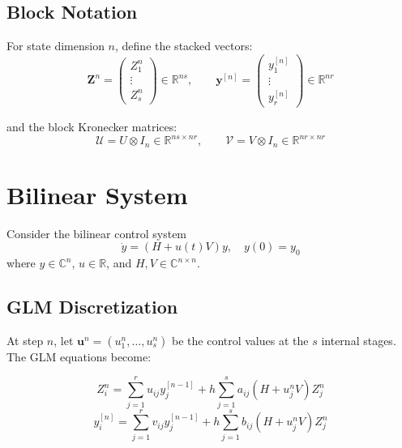 \documentclass[11pt]{article}
\newcommand{\RR}{\mathbb{R}}
\newcommand{\CC}{\mathbb{C}}
\newcommand{\Zv}{\mathbf{Z}}
\newcommand{\yv}{\mathbf{y}}
\newcommand{\uv}{\mathbf{u}}
\newcommand{\Uv}{\mathcal{U}}
\newcommand{\Vv}{\mathcal{V}}
\begin{document}
\subsection{Block Notation}

For state dimension $n$, define the stacked vectors:
\begin{equation}
\Zv^n = \begin{pmatrix} Z_1^n \\ \vdots \\ Z_s^n \end{pmatrix} \in \RR^{ns}, \qquad
\yv^{[n]} = \begin{pmatrix} y_1^{[n]} \\ \vdots \\ y_r^{[n]} \end{pmatrix} \in \RR^{nr}
\end{equation}

and the block Kronecker matrices:
\begin{equation}
\Uv = U \otimes I_n \in \RR^{ns \times nr}, \qquad \Vv = V \otimes I_n \in \RR^{nr \times nr}
\end{equation}

\section{Bilinear System}

Consider the bilinear control system
\begin{equation}
\dot{y} = (H + u(t)V)y, \quad y(0) = y_0
\end{equation}
where $y \in \CC^n$, $u \in \RR$, and $H, V \in \CC^{n \times n}$.

\subsection{GLM Discretization}

At step $n$, let $\uv^n = (u_1^n, \ldots, u_s^n)$ be the control values at the $s$ internal stages. The GLM equations become:

\begin{equation}
\label{eqn:bilinear_stage}
Z_i^n = \sum_{j=1}^r u_{ij} y_j^{[n-1]} + h \sum_{j=1}^s a_{ij} (H + u_j^n V) Z_j^n
\end{equation}
\begin{equation}
\label{eqn:bilinear_prop}
y_i^{[n]} = \sum_{j=1}^r v_{ij} y_j^{[n-1]} + h \sum_{j=1}^s b_{ij} (H + u_j^n V) Z_j^n
\end{equation}
\end{document}
